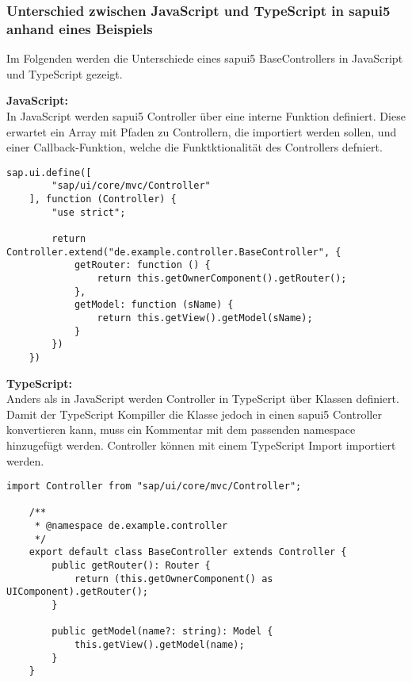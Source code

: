 \subsubsection[Unterschied zwischen JavaScript und TypeScript in \gls{sapui5} anhand eines Beispiels]{Unterschied zwischen JavaScript und TypeScript in \gls{sapui5} anhand eines Beispiels}
Im Folgenden werden die Unterschiede eines \gls{sapui5} BaseControllers in JavaScript und TypeScript gezeigt. 

\textbf{JavaScript:} \\
In JavaScript werden \gls{sapui5} Controller über eine interne Funktion definiert. 
Diese erwartet ein Array mit Pfaden zu Controllern, die importiert werden sollen, und einer Callback-Funktion, welche die Funktktionalität des Controllers defniert.
\begin{lstlisting}[caption={Beispiel: JavaScript BaseController.js}]
    sap.ui.define([
        "sap/ui/core/mvc/Controller"
    ], function (Controller) {
        "use strict";

        return Controller.extend("de.example.controller.BaseController", {
            getRouter: function () {
                return this.getOwnerComponent().getRouter();
            },
            getModel: function (sName) {
                return this.getView().getModel(sName);
            }
        })
    })
\end{lstlisting}

\textbf{TypeScript:} \\
Anders als in JavaScript werden Controller in TypeScript über Klassen definiert. 
Damit der TypeScript Kompiller die Klasse jedoch in einen \gls{sapui5} Controller konvertieren kann, muss ein Kommentar mit dem passenden namespace hinzugefügt werden.
Controller können mit einem TypeScript Import importiert werden.
\begin{lstlisting}[caption={Beispiel: TypeScript BaseController.ts}, ]
    import Controller from "sap/ui/core/mvc/Controller";

    /**
     * @namespace de.example.controller
     */
    export default class BaseController extends Controller {
        public getRouter(): Router {
            return (this.getOwnerComponent() as UIComponent).getRouter();
        }

        public getModel(name?: string): Model {
            this.getView().getModel(name);
        }
    }
\end{lstlisting}

